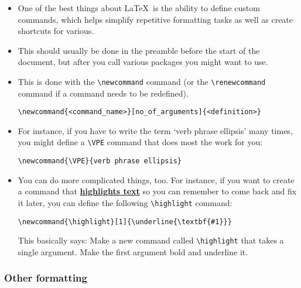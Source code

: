 \documentclass[11pt, letterpaper]{article}
\newcommand{\highlight}[1]{\underline{\textbf{#1}}}
\begin{document}
    \begin{itemize}
      \item One of the best things about \LaTeX\ is the ability to define custom commands, which helps simplify repetitive formatting tasks as well as create shortcuts for various.
      
      \item This should usually be done in the preamble before the start of the document, but after you call various packages you might want to use.
      
      \item This is done with the \verb|\newcommand| command (or the \verb|\renewcommand| command if a command needs to be redefined).
      
	\begin{exe}
	  \ex \verb|\newcommand{<command_name>}[no_of_arguments]{<definition>}|
	\end{exe}

      
      \item For instance, if you have to write the term `verb phrase ellipsis' many times, you might define a \verb|\VPE| command that does most the work for you:
      
	\begin{exe}
	  \ex \verb|\newcommand{\VPE}{verb phrase ellipsis}|
	\end{exe}

      
      \item You can do more complicated things, too. For instance, if you want to create a command that \highlight{highlights text} so you can remember to come back and fix it later, you can define the following \verb|\highlight| command:
      
	\begin{exe}
	  \ex \verb|\newcommand{\highlight}[1]{\underline{\textbf{#1}}}|
	\end{exe}

      	This basically says: Make a new command called \verb|\highlight| that takes a single argument. Make the first argument bold and underline it.

      
    \end{itemize}

  \subsubsection{Other formatting}
  
\end{document}
